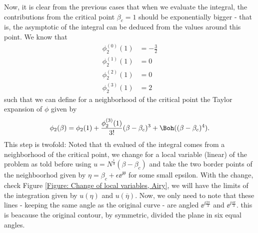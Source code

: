 {Now, it is clear from the previous cases that when we evaluate the integral, the contributions from the critical point $\beta_c = 1$ should be exponentially bigger - that is, the asymptotic of the integral can be deduced from the values around this point. We know that 
\begin{align}
	\phi^{(0)}_{2}(1) & = - \frac{3}{2} \\
	\phi^{(1)}_{2}(1) & = 0\\
	\phi^{(2)}_{2}(1) & = 0\\
	\phi^{(3)}_{2}(1) & = 2
\end{align}
such that we can define for a neighborhood of the critical point the Taylor expansion of $\phi$ given by
\begin{equation}
	\phi_{2}(\beta) = \phi_{2}(1) + \frac{\phi^{(3)}_{2}(1)}{3!} (\beta - \beta_c)^3 + \Boh((\beta - \beta_c)^4).
\end{equation}
This step is twofold: Noted that th evalued of the integral comes from a neighborhood of the critical point, we change for a local variable (linear) of the problem as told before using $u = N^{\frac{1}{3}}(\beta - \beta_c)$ and take the two border points of the neighboorhod given by $\eta = \beta_c + \epsilon \ee^{\ii \theta}$ for some small epsilon. With the change, check Figure \ref{Figure: Change of local variables, Airy}, we will have the limits of the integration given by $u(\eta)$ and $u(\overline{\eta})$. Now, we only need to note that these lines - keeping the same angle as the original curve - are angled $\ee^{\ii \frac{2\pi}{3}}$ and $\ee^{\ii \frac{4\pi}{3}}$. this is beacause the original contour, by symmetric, divided the plane in six equal angles. 
\begin{figure}
	\centering
\end{figure}}
